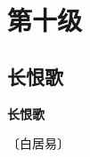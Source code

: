 \documentclass[12pt,UTF-8,openany,fontset=none]{ctexbook}
\begin{document}
\vspace{8pt}
\clearpage

\chapter{第十级}
\clearpage

\section{长恨歌}


\begin{center}
    {\bfseries 长恨歌}

    \vspace{18pt}

    \begin{large}\xuwen
        〔白居易〕
    \end{large}

\end{center}

    \vspace{6pt}  %
\end{document}
